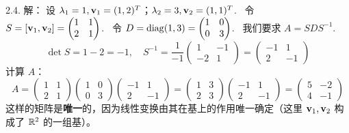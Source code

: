 \begin{exer}
2.4. 解：
设 $\lambda_1 = 1, \mathbf{v}_1 = (1, 2)^T$；$\lambda_2 = 3, \mathbf{v}_2 = (1, 1)^T$.~
令 $S = [\mathbf{v}_1, \mathbf{v}_2] = \begin{pmatrix} 1 & 1 \\ 2 & 1 \end{pmatrix}$.~
令 $D = \operatorname{diag}(1, 3) = \begin{pmatrix} 1 & 0 \\ 0 & 3 \end{pmatrix}$.~
我们要求 $A = S D S^{-1}$.~
$$ \det S = 1 - 2 = -1, \quad S^{-1} = \frac{1}{-1} \begin{pmatrix} 1 & -1 \\ -2 & 1 \end{pmatrix} = \begin{pmatrix} -1 & 1 \\ 2 & -1 \end{pmatrix} $$
计算 $A$：
$$ A = \begin{pmatrix} 1 & 1 \\ 2 & 1 \end{pmatrix} \begin{pmatrix} 1 & 0 \\ 0 & 3 \end{pmatrix} \begin{pmatrix} -1 & 1 \\ 2 & -1 \end{pmatrix} = \begin{pmatrix} 1 & 3 \\ 2 & 3 \end{pmatrix} \begin{pmatrix} -1 & 1 \\ 2 & -1 \end{pmatrix} = \begin{pmatrix} 5 & -2 \\ 4 & -1 \end{pmatrix} $$
这样的矩阵是\textbf{唯一}的，因为线性变换由其在基上的作用唯一确定（这里 $\mathbf{v}_1, \mathbf{v}_2$ 构成了 $\mathbb{R}^2$ 的一组基）。


\end{exer}
